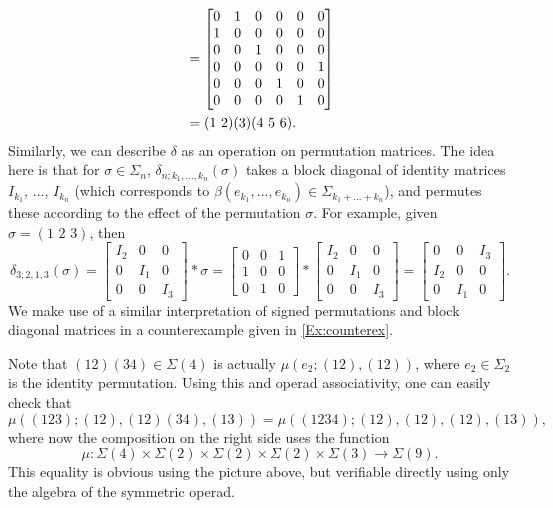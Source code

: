 \begin{example}
\begin{remark}
\begin{align*}
  &=
  \begin{bmatrix}
  0 & 1 & 0 & 0 & 0 & 0 \\
  1 & 0 & 0 & 0 & 0 & 0 \\
  0 & 0 & 1 & 0 & 0 & 0 \\
  0 & 0 & 0 & 0 & 0 & 1 \\
  0 & 0 & 0 & 1 & 0 & 0 \\
  0 & 0 & 0 & 0 & 1 & 0 \\
  \end{bmatrix} \\
  &= ( 1 \, \, 2 )(3)(4 \,\, 5 \,\, 6).
  \end{align*}
Similarly, we can describe $\delta$ as an operation on permutation matrices. The idea here is that for $\sigma \in \Sigma_n$, $\delta_{n;k_1,\ldots,k_n}(\sigma)$ takes a block diagonal of identity matrices $I_{k_1}$, $\ldots$, $I_{k_n}$ (which corresponds to $\beta(e_{k_1},\ldots,e_{k_n}) \in \Sigma_{k_1+\ldots+k_n}$), and permutes these according to the effect of the permutation $\sigma$. For example, given $\sigma = (1 \,\, 2 \,\, 3)$, then
  \[
    \delta_{3;2,1,3}(\sigma) =
    \begin{bmatrix}
    I_2 & 0 & 0 \\
    0 & I_1 & 0 \\
    0 & 0 & I_3
    \end{bmatrix}
    \ast
    \sigma
    =
      \begin{bmatrix}
      0 & 0 & 1 \\
      1 & 0 & 0 \\
      0 & 1 & 0
      \end{bmatrix}
    \ast
    \begin{bmatrix}
    I_2 & 0 & 0 \\
    0 & I_1 & 0 \\
    0 & 0 & I_3
    \end{bmatrix}
    =
    \begin{bmatrix}
    0 & 0 & I_3 \\
    I_2 & 0 & 0 \\
    0 & I_1 & 0
    \end{bmatrix}.
  \]
We make use of a similar interpretation of signed permutations and block diagonal matrices in a counterexample given in \cref{Ex:counterex}.
\end{remark}

  
Note that $(12)(34) \in \Sigma(4)$ is actually $\mu(e_{2}; (12), (12))$, where $e_{2} \in \Sigma_{2}$ is the identity permutation. Using this and operad associativity, one can easily check that
  \[
    \mu \left( (123); (12), (12)(34), (13) \right) = \mu \left( (1234); (12), (12), (12), (13) \right),
  \]
where now the composition on the right side uses the function
  \[
    \mu \colon \Sigma(4) \times \Sigma(2) \times \Sigma(2) \times \Sigma(2) \times \Sigma(3) \rightarrow \Sigma(9).
  \]
This equality is obvious using the picture above, but verifiable directly using only the algebra of the symmetric operad.
\end{example}

